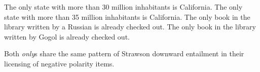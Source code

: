 \begin{exe}
	\ex \label{ca-30} The only state with more than 30 million inhabitants is California.
	\ex \label{ca-35} The only state with more than 35 million inhabitants is California.
	\ex \label{russian-book} The only book in the library written by a Russian is already checked out.
	\ex \label{gogol-book} The only book in the library written by Gogol is already checked out.
\end{exe}

Both \textit{only}s share the same pattern of Strawson downward entailment in their licensing of negative polarity items.